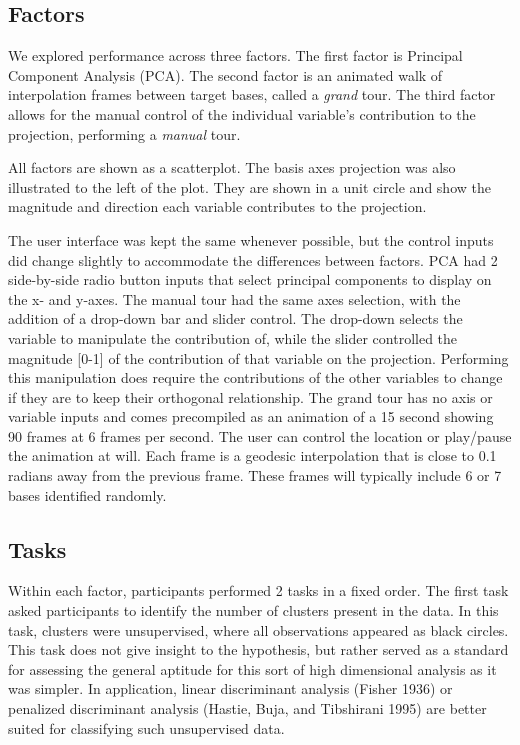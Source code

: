 \documentclass[
]{article}
\begin{document}
\hypertarget{sec:factors}{%
\subsection{Factors}\label{sec:factors}}

We explored performance across three factors. The first factor is
Principal Component Analysis (PCA). The second factor is an animated
walk of interpolation frames between target bases, called a \emph{grand}
tour. The third factor allows for the manual control of the individual
variable's contribution to the projection, performing a \emph{manual}
tour.

All factors are shown as a scatterplot. The basis axes projection was
also illustrated to the left of the plot. They are shown in a unit
circle and show the magnitude and direction each variable contributes to
the projection.

The user interface was kept the same whenever possible, but the control
inputs did change slightly to accommodate the differences between
factors. PCA had 2 side-by-side radio button inputs that select
principal components to display on the x- and y-axes. The manual tour
had the same axes selection, with the addition of a drop-down bar and
slider control. The drop-down selects the variable to manipulate the
contribution of, while the slider controlled the magnitude {[}0-1{]} of
the contribution of that variable on the projection. Performing this
manipulation does require the contributions of the other variables to
change if they are to keep their orthogonal relationship. The grand tour
has no axis or variable inputs and comes precompiled as an animation of
a 15 second showing 90 frames at 6 frames per second. The user can
control the location or play/pause the animation at will. Each frame is
a geodesic interpolation that is close to 0.1 radians away from the
previous frame. These frames will typically include 6 or 7 bases
identified randomly.

\hypertarget{sec:tasks}{%
\subsection{Tasks}\label{sec:tasks}}

Within each factor, participants performed 2 tasks in a fixed order. The
first task asked participants to identify the number of clusters present
in the data. In this task, clusters were unsupervised, where all
observations appeared as black circles. This task does not give insight
to the hypothesis, but rather served as a standard for assessing the
general aptitude for this sort of high dimensional analysis as it was
simpler. In application, linear discriminant analysis (Fisher 1936) or
penalized discriminant analysis (Hastie, Buja, and Tibshirani 1995) are
better suited for classifying such unsupervised data.
\end{document}
